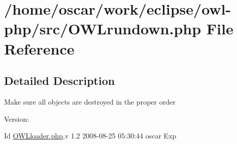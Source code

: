 \hypertarget{OWLrundown_8php}{
\section{/home/oscar/work/eclipse/owl-php/src/OWLrundown.php File Reference}
\label{OWLrundown_8php}
}


\subsection{Detailed Description}
Make sure all objects are destroyed in the proper order \begin{Desc}
\item[Version:]\end{Desc}
\begin{Desc}
\item[Id]\hyperlink{OWLloader_8php}{OWLloader.php},v 1.2 2008-08-25 05:30:44 oscar Exp \end{Desc}

